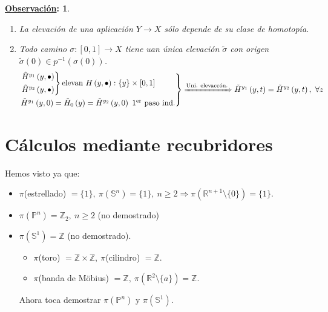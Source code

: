 \documentclass[10pt,a4paper,openright]{book}
\theoremstyle{break}
\newtheorem*{obs}{\underline{Observación}:}
\begin{document}
\begin{obs}
\begin{enumerate}
    \item La elevación de una aplicación $Y \rightarrow X$ sólo depende de su clase de homotopía.
    \item Todo camino $\sigma: \left[ 0, 1 \right] \rightarrow X$ tiene uan única elevación $\tilde{\sigma}$ con origen $\tilde{\sigma}\left( 0 \right) \in p^{-1}\left( \sigma\left( 0 \right) \right)$.
    \[
    \begin{rcases}
    \begin{rcases}
        \tilde{H}^{y_1} \left( y, \bullet \right)\\
        \tilde{H}^{y_2} \left( y, \bullet \right) 
    \end{rcases} \text{elevan } H\left( y, \bullet \right) : \{y\} \times \left[ 0, 1 \right] \\  
    \tilde{H}^{y_1} \left( y, 0 \right) = \tilde{H}_0\left( y \right) = \tilde{H}^{y_2} \left( y, 0 \right) \text{ 1\textsuperscript{er} paso ind.} 
    \end{rcases} \xRightarrow{\text{Uni. elevaccón.}} 
    \tilde{H}^{y_1} \left( y, t \right) = \tilde{H}^{y_2} \left( y, t \right),\ \forall z
    \]
\end{enumerate}
\end{obs}


\chapter{Cálculos mediante recubridores}%
\label{cha:calculos_mediante_recubridores}
Hemos visto ya que:
\begin{itemize}
    \item $\pi$(estrellado) $= \{1\},\ \pi\left( \mathbb{S}^n \right) = \{1\},\ n \ge 2 \Rightarrow \pi\left( \mathbb{R}^{n + 1} \setminus \{0\} \right) = \{1\}$.
    \item $\pi\left( \mathbb{P}^{n} \right) = \mathbb{Z}_2,\ n \ge  2$ (no demostrado)
    \item $\pi\left( \mathbb{S}^1 \right) = \mathbb{Z}$ (no demostrado).
    \begin{itemize}
        \item $\pi$(toro) $= \mathbb{Z} \times \mathbb{Z},\ \pi$(cilindro) $= \mathbb{Z}$.
        \item $\pi$(banda de Möbius) $= \mathbb{Z},\ \pi\left( \mathbb{R}^2 \setminus \{a\} \right) = \mathbb{Z}$.
    \end{itemize}
    Ahora toca demostrar $\pi\left( \mathbb{P}^{n} \right)$ y $\pi\left( \mathbb{S}^1 \right)$.
\end{itemize}
\end{document}
